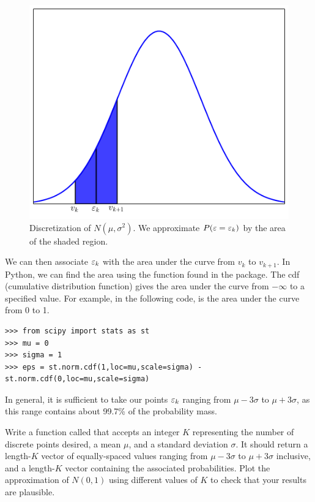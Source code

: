 \begin{figure}[h!]
\label{stoch1_fig1}
\begin{center}
\includegraphics[width = \textwidth]{discnorm.pdf}
\end{center}
\caption{Discretization of $N(\mu,\sigma^2)$.  We approximate $P(\varepsilon = \varepsilon_k)$ by the area of the shaded region.}
\end{figure}

We can then associate $\varepsilon_k$ with the area under the curve from $v_k$ to $v_{k+1}$.
In Python, we can find the area using the function  found in the  package.
The cdf (cumulative distribution function) gives the area under the curve from $-\infty$ to a specified value.
For example, in the following code,  is the area under the curve from 0 to 1.

\begin{lstlisting}
>>> from scipy import stats as st
>>> mu = 0
>>> sigma = 1
>>> eps = st.norm.cdf(1,loc=mu,scale=sigma) - st.norm.cdf(0,loc=mu,scale=sigma)
\end{lstlisting}

In general, it is sufficient to take our points $\varepsilon_k$ ranging from $\mu - 3\sigma$ to $\mu + 3\sigma$, as this
range contains about 99.7\% of the probability mass.

\begin{problem}
Write a function called  that accepts an integer $K$ representing the number of discrete points
desired, a mean $\mu$, and a standard deviation $\sigma$. It should return a length-$K$ vector of equally-spaced
values ranging from $\mu - 3\sigma$ to $\mu + 3\sigma$ inclusive,
and a length-$K$ vector containing the associated probabilities.
Plot the approximation of $N(0,1)$ using different values of $K$ to check that your results are plausible.
\end{problem}

